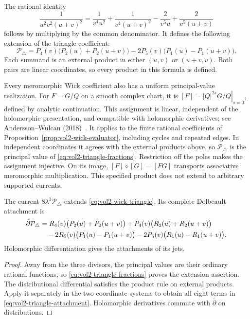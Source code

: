 The rational identity
\begin{equation}\label{eq:vol2-triangle-fractions}
 \frac1{u^2v^2(u+v)^2}
 =\frac1{v^4u^2}+\frac1{v^4(u+v)^2}
   -\frac2{v^5u}+\frac2{v^5(u+v)}
\end{equation}
follows by multiplying by the common denominator. It defines the
following extension of the triangle coefficient:
\begin{equation}\label{eq:vol2-triangle-current}
 \mathcal P_\triangle
 =P_4(v)\bigl(P_2(u)+P_2(u+v)\bigr)
       -2P_5(v)\bigl(P_1(u)-P_1(u+v)\bigr).
\end{equation}
Each summand is an external product in either $(u,v)$ or $(u+v,v)$.
Both pairs are linear coordinates, so every product in this formula
is defined.

Every meromorphic Wick coefficient also has a uniform principal-value
realization. For $F=G/Q$ on a smooth complex chart, it is
$[F]=\left.|Q|^{2s}G/Q\right|_{s=0}$, defined by analytic
continuation. This assignment is linear, independent of the
holomorphic presentation, and compatible with holomorphic derivatives;
see Andersson--Wulcan (2018)~\cite[\S2, Example~4.6, Corollary~4.26]{AnderssonWulcan2018}.
It applies to the finite rational coefficients of
Proposition~\ref{prop:vol2-wick-evaluator}, including cycles and
repeated edges. In independent coordinates it agrees with the
external products above, so $\mathcal P_\triangle$ is the
principal value of \eqref{eq:vol2-triangle-fractions}.
Restriction off the poles makes the assignment injective.
On its image, $[F]\diamond[G]=[FG]$ transports associative
meromorphic multiplication. This specified product does not extend
to arbitrary supported currents.

\begin{proposition}\label{prop:vol2-triangle-current}
The current $8\lambda^3\mathcal P_\triangle$ extends
\eqref{eq:vol2-wick-triangle}. Its complete Dolbeault attachment is
\begin{align}\label{eq:vol2-triangle-attachment}
 \bar\partial\mathcal P_\triangle
 &=R_4(v)\bigl(P_2(u)+P_2(u+v)\bigr)
   +P_4(v)\bigl(R_2(u)+R_2(u+v)\bigr)\notag\\
 &\quad-2R_5(v)\bigl(P_1(u)-P_1(u+v)\bigr)
   -2P_5(v)\bigl(R_1(u)-R_1(u+v)\bigr).
\end{align}
Holomorphic differentiation gives the attachments of its jets.
\end{proposition}

\begin{proof}
Away from the three divisors, the principal values are their
ordinary rational functions, so \eqref{eq:vol2-triangle-fractions}
proves the extension assertion. The distributional differential
satisfies the product rule on external products. Apply it separately
in the two coordinate systems to obtain all eight terms in
\eqref{eq:vol2-triangle-attachment}. Holomorphic derivatives commute
with $\bar\partial$ on distributions.
\end{proof}

